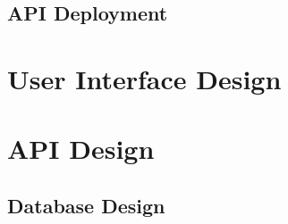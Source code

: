 \subsection{API Deployment}


\section{User Interface Design}


\section{API Design}


\subsection{Database Design}

